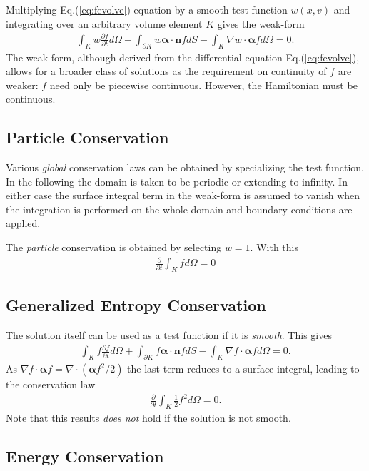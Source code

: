 \documentclass[11pt, reqno]{amsart}
\newcommand{\eqr}[1]{Eq.\thinspace(#1)}
\newcommand{\pfrac}[2]{\frac{\partial #1}{\partial #2}}
\newcommand{\pfraca}[1]{\frac{\partial}{\partial #1}}
\newcommand{\mvec}[1]{\mathbf{#1}}
\newcommand{\gvec}[1]{\boldsymbol{#1}}
\theoremstyle{definition}
\begin{document}
Multiplying \eqr{\ref{eq:fevolve}} equation by a smooth test function
$w(x,v)$ and integrating over an arbitrary volume element $K$ gives
the weak-form
\begin{align}
  \int_K w\pfrac{f}{t}d\Omega 
  + \int_{\partial K}w \gvec{\alpha}\cdot\mvec{n}f dS
  - \int_K \nabla w \cdot \gvec{\alpha} f d\Omega
 = 0. \label{eq:weak-form}
\end{align}
The weak-form, although derived from the differential equation
\eqr{\ref{eq:fevolve}}, allows for a broader class of solutions as the
requirement on continuity of $f$ are weaker: $f$ need only be
piecewise continuous. However, the Hamiltonian must be continuous.

\subsection{Particle Conservation}

Various \emph{global} conservation laws can be obtained by
specializing the test function. In the following the domain is taken
to be periodic or extending to infinity. In either case the surface
integral term in the weak-form is assumed to vanish when the
integration is performed on the whole domain and boundary conditions
are applied.

The \emph{particle} conservation is obtained by selecting $w=1$. With
this
\begin{align}
  \pfraca{t}\int_K f d\Omega = 0
\end{align}

\subsection{Generalized Entropy Conservation}

The solution itself can be used as a test function if it is
\emph{smooth}. This gives
\begin{align}
  \int_K f\pfrac{f}{t}d\Omega 
  + \int_{\partial K}f \gvec{\alpha}\cdot\mvec{n}f dS
  - \int_K \nabla f \cdot \gvec{\alpha} f d\Omega
 = 0.
\end{align}
As $\nabla f \cdot \gvec{\alpha} f = \nabla\cdot (\gvec{\alpha}
f^2/2)$ the last term reduces to a surface integral, leading to the
conservation law
\begin{align}
  \pfraca{t}\int_K \frac{1}{2}f^2 d\Omega = 0.
\end{align}
Note that this results \emph{does not} hold if the solution is not
smooth.

\subsection{Energy Conservation}
\end{document}
